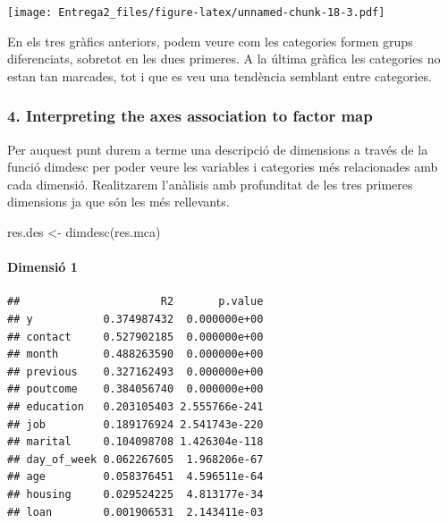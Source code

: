 \documentclass[
]{article}
\newenvironment{Shaded}{\begin{snugshade}}{\end{snugshade}}
\newcommand{\AttributeTok}[1]{\textcolor[rgb]{0.77,0.63,0.00}{#1}}
\newcommand{\FunctionTok}[1]{\textcolor[rgb]{0.00,0.00,0.00}{#1}}
\newcommand{\NormalTok}[1]{#1}
\newcommand{\OtherTok}[1]{\textcolor[rgb]{0.56,0.35,0.01}{#1}}
\newcommand{\SpecialCharTok}[1]{\textcolor[rgb]{0.00,0.00,0.00}{#1}}
\newcommand{\StringTok}[1]{\textcolor[rgb]{0.31,0.60,0.02}{#1}}
\begin{document}
\texttt{[image: Entrega2\_files/figure-latex/unnamed-chunk-18-3.pdf]}

En els tres gràfics anteriors, podem veure com les categories formen
grups diferenciats, sobretot en les dues primeres. A la última gràfica
les categories no estan tan marcades, tot i que es veu una tendència
semblant entre categories.

\hypertarget{interpreting-the-axes-association-to-factor-map}{%
\subsubsection{4. Interpreting the axes association to factor
map}\label{interpreting-the-axes-association-to-factor-map}}

Per auquest punt durem a terme una descripció de dimensions a través de
la funció dimdesc per poder veure les variables i categories més
relacionades amb cada dimensió. Realitzarem l'anàlisis amb profunditat
de les tres primeres dimensions ja que són les més rellevants.

\begin{Shaded}
\begin{Highlighting}[]
\NormalTok{res.des }\OtherTok{\textless{}{-}} \FunctionTok{dimdesc}\NormalTok{(res.mca)}
\end{Highlighting}
\end{Shaded}

\hypertarget{dimensiuxf3-1}{%
\paragraph{Dimensió 1}\label{dimensiuxf3-1}}

\begin{Shaded}
\end{Shaded}

\begin{verbatim}
##                      R2       p.value
## y           0.374987432  0.000000e+00
## contact     0.527902185  0.000000e+00
## month       0.488263590  0.000000e+00
## previous    0.327162493  0.000000e+00
## poutcome    0.384056740  0.000000e+00
## education   0.203105403 2.555766e-241
## job         0.189176924 2.541743e-220
## marital     0.104098708 1.426304e-118
## day_of_week 0.062267605  1.968206e-67
## age         0.058376451  4.596511e-64
## housing     0.029524225  4.813177e-34
## loan        0.001906531  2.143411e-03
\end{verbatim}
\end{document}
